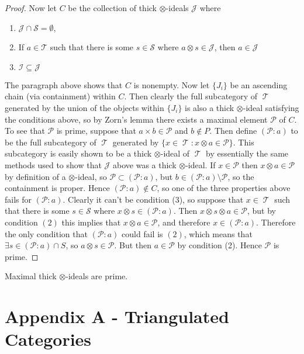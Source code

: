 \documentclass[11pt]{article}
\DeclareMathOperator{\TT}{\mathcal{T}}
\begin{document}
\begin{proof}
Now let $C$ be the collection of thick $\otimes$-ideals $\mathcal{J}$ where 
\begin{enumerate}[(1)]
	\item $\mathcal{J} \cap \mathcal{S} = \emptyset$,
	\item If $a \in \mathcal{T}$ such that there is some $s \in \mathcal{S}$ where $a \otimes s \in \mathcal{J}$, then $a \in \mathcal{J}$
	\item $\mathcal{I} \subseteq \mathcal{J}$
\end{enumerate}
The paragraph above shows that $C$ is nonempty. Now let $\{J_i\}$ be an ascending chain (via containment) within $C$. Then clearly the full subcategory of $\TT$ generated by the union of the objects within $\{J_i\}$ is also a thick $\otimes$-ideal satisfying the conditions above, so by Zorn's lemma there exists a maximal element $\mathcal{P}$ of $C$. To see that $\mathcal{P}$ is prime, suppose that $a \times b \in \mathcal{P}$ and $b \not\in P$. Then define $(\mathcal{P}:a)$ to be the full subcategory of $\TT$ generated by $\{x \in \TT: x \otimes a \in \mathcal{P}\}$. This subcategory is easily shown to be a thick $\otimes$-ideal of $\TT$ by essentially the same methods used to show that $\mathcal{J}$ above was a thick $\otimes$-ideal. If $x \in \mathcal{P}$ then $x \otimes a \in \mathcal{P}$ by definition of a $\otimes$-ideal, so $\mathcal{P} \subset (\mathcal{P}: a)$, but $b \in (\mathcal{P}: a) \setminus \mathcal{P}$, so the containment is proper. Hence $(\mathcal{P}:a) \not\in C$, so one of the three properties above fails for $(\mathcal{P}:a)$. Clearly it can't be condition (3), so suppose that $x \in \TT$ such that there is some $s \in \mathcal{S}$ where $x \otimes s \in (\mathcal{P}: a)$. Then $x \otimes s \otimes a \in \mathcal{P}$, but by condition $(2)$ this implies that $x \otimes a \in \mathcal{P}$, and therefore $x \in (\mathcal{P}:a)$. Therefore the only condition that $(\mathcal{P}:a)$ could fail is $(2)$, which means that $\exists s \in (\mathcal{P}:a) \cap S$, so $a \otimes s \in \mathcal{P}$. But then $a \in \mathcal{P}$ by condition (2). Hence $\mathcal{P}$ is prime.
\end{proof}

\begin{cor}
Maximal thick $\otimes$-ideals are prime.
\end{cor}


\newpage


\section{Appendix A - Triangulated Categories}
\end{document}

